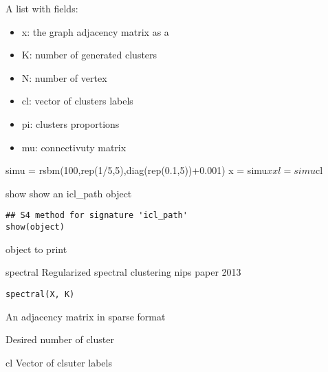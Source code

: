 \documentclass[letterpaper]{book}
\begin{document}
%
\begin{Value}
A list with fields:
\begin{itemize}

\item x: the graph adjacency matrix as a 
\item K: number of generated clusters
\item N: number of vertex
\item cl: vector of clusters labels
\item pi: clusters proportions
\item mu: connectivuty matrix

\end{itemize}

\end{Value}
%
\begin{Examples}
\begin{ExampleCode}
simu = rsbm(100,rep(1/5,5),diag(rep(0.1,5))+0.001)
x  = simu$x
xl = simu$cl
\end{ExampleCode}
\end{Examples}
%
\begin{Description}\relax
show
show an icl\_path object
\end{Description}
%
\begin{Usage}
\begin{verbatim}
## S4 method for signature 'icl_path'
show(object)
\end{verbatim}
\end{Usage}
%
\begin{Arguments}
\begin{ldescription}
\item[\code{object}]  object to print
\end{ldescription}
\end{Arguments}
%
\begin{Description}\relax
spectral
Regularized spectral clustering nips paper 2013
\end{Description}
%
\begin{Usage}
\begin{verbatim}
spectral(X, K)
\end{verbatim}
\end{Usage}
%
\begin{Arguments}
\begin{ldescription}
\item[\code{X}] An adjacency matrix in sparse format

\item[\code{K}] Desired number of cluster
\end{ldescription}
\end{Arguments}
%
\begin{Value}
cl Vector of clsuter labels
\end{Value}
\printindex{}
\end{document}
